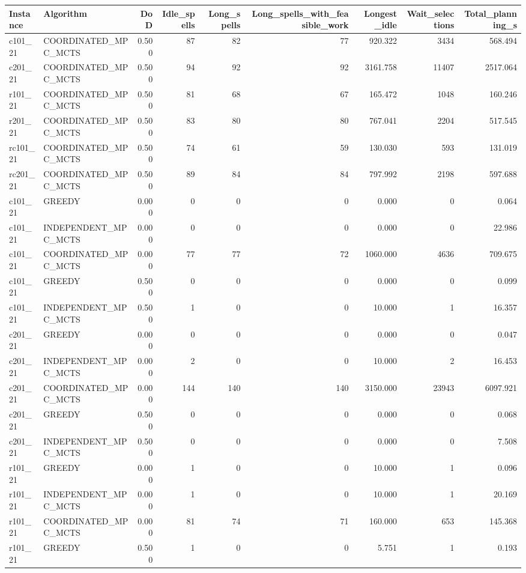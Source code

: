 \begin{tabular}{llrrrrrrr}
\toprule
Instance & Algorithm & DoD & Idle\_spells & Long\_spells & Long\_spells\_with\_feasible\_work & Longest\_idle & Wait\_selections & Total\_planning\_s \\
\midrule
c101\_21 & COORDINATED\_MPC\_MCTS & 0.500 & 87 & 82 & 77 & 920.322 & 3434 & 568.494 \\
c201\_21 & COORDINATED\_MPC\_MCTS & 0.500 & 94 & 92 & 92 & 3161.758 & 11407 & 2517.064 \\
r101\_21 & COORDINATED\_MPC\_MCTS & 0.500 & 81 & 68 & 67 & 165.472 & 1048 & 160.246 \\
r201\_21 & COORDINATED\_MPC\_MCTS & 0.500 & 83 & 80 & 80 & 767.041 & 2204 & 517.545 \\
rc101\_21 & COORDINATED\_MPC\_MCTS & 0.500 & 74 & 61 & 59 & 130.030 & 593 & 131.019 \\
rc201\_21 & COORDINATED\_MPC\_MCTS & 0.500 & 89 & 84 & 84 & 797.992 & 2198 & 597.688 \\
c101\_21 & GREEDY & 0.000 & 0 & 0 & 0 & 0.000 & 0 & 0.064 \\
c101\_21 & INDEPENDENT\_MPC\_MCTS & 0.000 & 0 & 0 & 0 & 0.000 & 0 & 22.986 \\
c101\_21 & COORDINATED\_MPC\_MCTS & 0.000 & 77 & 77 & 72 & 1060.000 & 4636 & 709.675 \\
c101\_21 & GREEDY & 0.500 & 0 & 0 & 0 & 0.000 & 0 & 0.099 \\
c101\_21 & INDEPENDENT\_MPC\_MCTS & 0.500 & 1 & 0 & 0 & 10.000 & 1 & 16.357 \\
c201\_21 & GREEDY & 0.000 & 0 & 0 & 0 & 0.000 & 0 & 0.047 \\
c201\_21 & INDEPENDENT\_MPC\_MCTS & 0.000 & 2 & 0 & 0 & 10.000 & 2 & 16.453 \\
c201\_21 & COORDINATED\_MPC\_MCTS & 0.000 & 144 & 140 & 140 & 3150.000 & 23943 & 6097.921 \\
c201\_21 & GREEDY & 0.500 & 0 & 0 & 0 & 0.000 & 0 & 0.068 \\
c201\_21 & INDEPENDENT\_MPC\_MCTS & 0.500 & 0 & 0 & 0 & 0.000 & 0 & 7.508 \\
r101\_21 & GREEDY & 0.000 & 1 & 0 & 0 & 10.000 & 1 & 0.096 \\
r101\_21 & INDEPENDENT\_MPC\_MCTS & 0.000 & 1 & 0 & 0 & 10.000 & 1 & 20.169 \\
r101\_21 & COORDINATED\_MPC\_MCTS & 0.000 & 81 & 74 & 71 & 160.000 & 653 & 145.368 \\
r101\_21 & GREEDY & 0.500 & 1 & 0 & 0 & 5.751 & 1 & 0.193 \\

\end{tabular}
